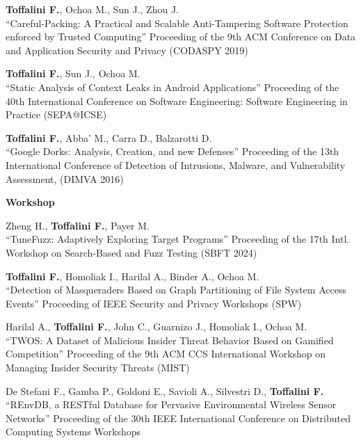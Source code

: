 \begin{enumerate}[label={[C\arabic*]},leftmargin=5mm]
\item \textbf{Toffalini F.}, Ochoa M., Sun J., Zhou J.\\``Careful-Packing: A Practical and Scalable Anti-Tampering Software Protection enforced by Trusted Computing'' Proceeding of the 9th ACM Conference on Data and Application Security and Privacy (CODASPY 2019)
\item \textbf{Toffalini F.}, Sun J., Ochoa M.\\``Static Analysis of Context Leaks in Android Applications'' Proceeding of the 40th International Conference on Software Engineering: Software Engineering in Practice (SEPA@ICSE)
\item \textbf{Toffalini F.}, Abba' M., Carra D., Balzarotti D.\\``Google Dorks: Analysis, Creation, and new Defenses'' Proceeding of the 13th International Conference of Detection of Intrusions, Malware, and Vulnerability Assessment, (DIMVA 2016)
\end{enumerate}
\textbf{Workshop}\begin{enumerate}[label={[W\arabic*]},leftmargin=5mm]
\item Zheng H., \textbf{Toffalini F.}, Payer M.\\``TuneFuzz: Adaptively Exploring Target Programs'' Proceeding of the 17th Intl. Workshop on Search-Based and Fuzz Testing (SBFT 2024)
\item \textbf{Toffalini F.}, Homoliak I., Harilal A., Binder A., Ochoa M.\\``Detection of Masqueraders Based on Graph Partitioning of File System Access Events'' Proceeding of IEEE Security and Privacy Workshops (SPW)
\item Harilal A., \textbf{Toffalini F.}, John C., Guarnizo J., Homoliak I., Ochoa M.\\``TWOS: A Dataset of Malicious Insider Threat Behavior Based on Gamified Competition'' Proceeding of the 9th ACM CCS International Workshop on Managing Insider Security Threats (MIST)
\item De Stefani F., Gamba P., Goldoni E., Savioli A., Silvestri D., \textbf{Toffalini F.}\\``REnvDB, a RESTful Database for Pervasive Environmental Wireless Sensor Networks'' Proceeding of the 30th IEEE International Conference on Distributed Computing Systems Workshops
\end{enumerate}
